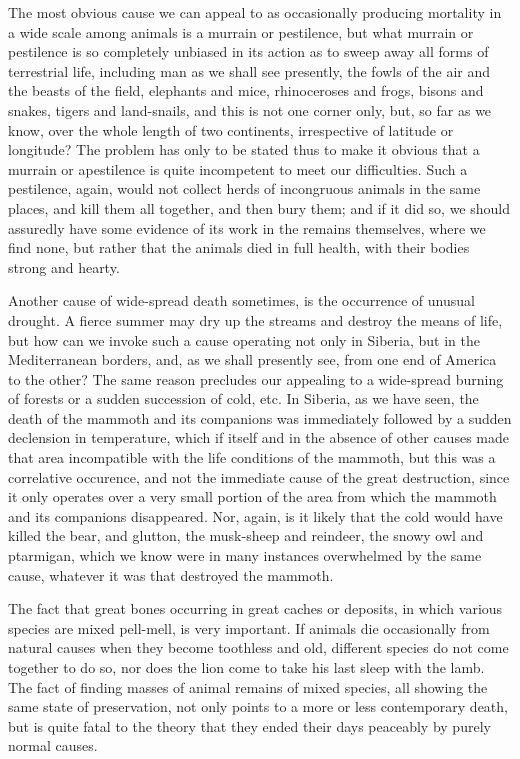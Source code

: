 The most obvious cause we can appeal to as occasionally producing mortality in a wide scale
among animals is a murrain or pestilence, but what murrain or pestilence is so completely
unbiased in its action as to sweep away all forms of terrestrial life, including man as we shall
see presently, the fowls of the air and the beasts of the field, elephants and mice, rhinoceroses
and frogs, bisons and snakes, tigers and land-snails, and this is not one corner only, but, so
far as we know, over the whole length of two continents, irrespective of latitude or
longitude? The problem has only to be stated thus to make it obvious that a murrain or apestilence is quite incompetent to meet our difficulties. Such a pestilence, again, would not
collect herds of incongruous animals in the same places, and kill them all together, and then
bury them; and if it did so, we should assuredly have some evidence of its work in the
remains themselves, where we find none, but rather that the animals died in full health, with
their bodies strong and hearty.

Another cause of wide-spread death sometimes, is the occurrence of unusual drought. A
fierce summer may dry up the streams and destroy the means of life, but how can we invoke
such a cause operating not only in Siberia, but in the Mediterranean borders, and, as we shall
presently see, from one end of America to the other? The same reason precludes our
appealing to a wide-spread burning of forests or a sudden succession of cold, etc. In Siberia,
as we have seen, the death of the mammoth and its companions was immediately followed by
a sudden declension in temperature, which if itself and in the absence of other causes made
that area incompatible with the life conditions of the mammoth, but this was a correlative
occurence, and not the immediate cause of the great destruction, since it only operates over a
very small portion of the area from which the mammoth and its companions disappeared.
Nor, again, is it likely that the cold would have killed the bear, and glutton, the musk-sheep
and reindeer, the snowy owl and ptarmigan, which we know were in many instances
overwhelmed by the same cause, whatever it was that destroyed the mammoth.

The fact that great bones occurring in great caches or deposits, in which various species are
mixed pell-mell, is very important. If animals die occasionally from natural causes when they
become toothless and old, different species do not come together to do so, nor does the lion
come to take his last sleep with the lamb. The fact of finding masses of animal remains of
mixed species, all showing the same state of preservation, not only points to a more or less
contemporary death, but is quite fatal to the theory that they ended their days peaceably by
purely normal causes.

